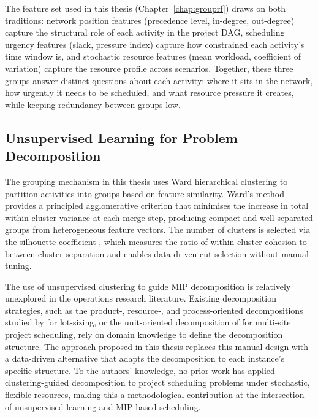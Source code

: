 The feature set used in this thesis (Chapter~\ref{chap:grouprf}) draws on both
traditions: network position features (precedence level, in-degree, out-degree) capture
the structural role of each activity in the project DAG, scheduling urgency features
(slack, pressure index) capture how constrained each activity's time window is, and
stochastic resource features (mean workload, coefficient of variation) capture the
resource profile across scenarios. Together, these three groups answer distinct questions about each activity: where it sits in the network, how urgently it needs to
be scheduled, and what resource pressure it creates, while keeping
redundancy between groups low.

\subsection*{Unsupervised Learning for Problem Decomposition}
The grouping mechanism in this thesis uses Ward hierarchical clustering
\parencite{Ward1963} to partition activities into groups based on feature similarity.
Ward's method provides a principled agglomerative criterion that minimises the increase
in total within-cluster variance at each merge step, producing compact and
well-separated groups from heterogeneous feature vectors. The number of clusters is
selected via the silhouette coefficient \parencite{Rousseeuw1987}, which measures the
ratio of within-cluster cohesion to between-cluster separation and enables data-driven
cut selection without manual tuning.

The use of unsupervised clustering to guide MIP decomposition is relatively unexplored
in the operations research literature. Existing decomposition strategies, such as the
product-, resource-, and process-oriented decompositions studied by \cite{Helber2010}
for lot-sizing, or the unit-oriented decomposition of \cite{bigler2024multisite} for
multi-site project scheduling, rely on domain knowledge to define the decomposition
structure. The approach proposed in this thesis replaces this manual design with a
data-driven alternative that adapts the decomposition to each instance's specific
structure. To the authors' knowledge,
no prior work has applied clustering-guided decomposition to project scheduling problems
under stochastic, flexible resources, making this a methodological contribution at the intersection of
unsupervised learning and MIP-based scheduling.
